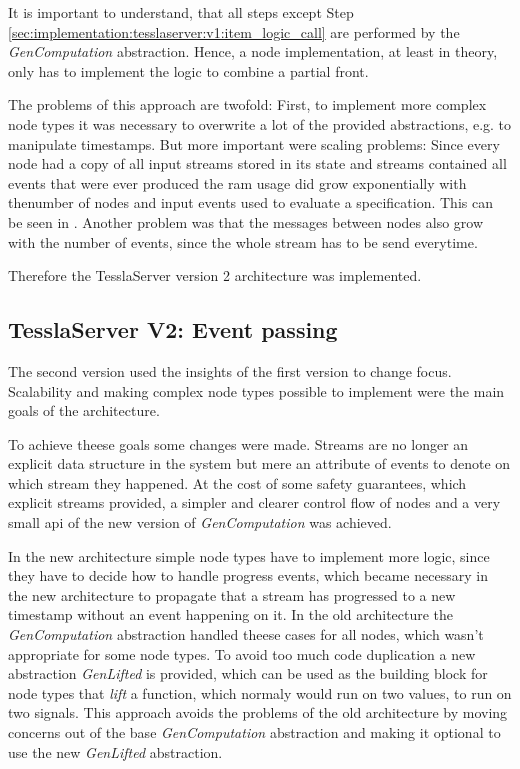 It is important to understand, that all steps except Step \ref{sec:implementation:tesslaserver:v1:item_logic_call} are performed by the \emph{GenComputation} abstraction.
Hence, a node implementation, at least in theory, only has to implement the logic to combine a partial front.

The problems of this approach are twofold:
First, to implement more complex node types it was necessary to overwrite a lot of the provided abstractions, e.g. to manipulate timestamps.
But more important were scaling problems: Since every node had a copy of all input streams stored in its state and streams contained all events that were ever produced the \gls{ram} usage did grow exponentially with thenumber of nodes and input events used to evaluate a specification.
This can be seen in .
Another problem was that the messages between nodes also grow with the number of events, since the whole stream has to be send everytime.

Therefore the TesslaServer version 2 architecture was implemented.

\subsection{TesslaServer V2: Event passing}
\label{sec:implementation:tesslaserver:v2}

The second version used the insights of the first version to change focus.
Scalability and making complex node types possible to implement were the main goals of the architecture.

To achieve theese goals some changes were made.
Streams are no longer an explicit data structure in the system but mere an attribute of events to denote on which stream they happened.
At the cost of some safety guarantees, which explicit streams provided, a simpler and clearer control flow of nodes and a very small \gls{api} of the new version of \emph{GenComputation} was achieved.

In the new architecture simple node types have to implement more logic, since they have to decide how to handle progress events, which became necessary in the new architecture to propagate that a stream has progressed to a new timestamp without an event happening on it.
In the old architecture the \emph{GenComputation} abstraction handled theese cases for all nodes, which wasn't appropriate for some node types.
To avoid too much code duplication a new abstraction \emph{GenLifted} is provided, which can be used as the building block for node types that \emph{lift} a function, which normaly would run on two values, to run on two signals.
This approach avoids the problems of the old architecture by moving concerns out of the base \emph{GenComputation} abstraction and making it optional to use the new \emph{GenLifted} abstraction.

